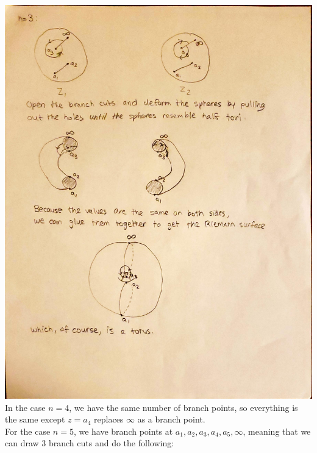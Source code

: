 \documentclass{article}
\begin{document}
\includegraphics[scale=0.4]{567hw3fig1.pdf}\\
In the case $n=4$, we have the same number of branch points, so everything is the same except $z=a_4$ replaces $\infty$ as a branch point.\\
For the case $n=5$, we have branch points at $a_1, a_2, a_3, a_4, a_5, \infty$, meaning that we can draw 3 branch cuts and do the following:\\
\end{document}
